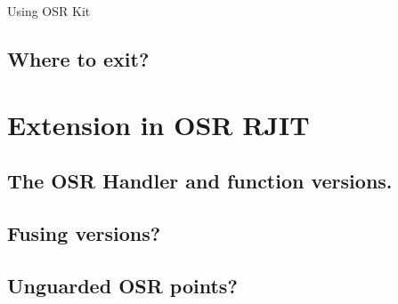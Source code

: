
Using OSR Kit 
 
\subsection{Where to exit?}

\section{Extension in OSR RJIT}\label{extendingOSR}

\subsection{The OSR Handler and function versions.}

\subsection{Fusing versions?}


\subsection{Unguarded OSR points?}


